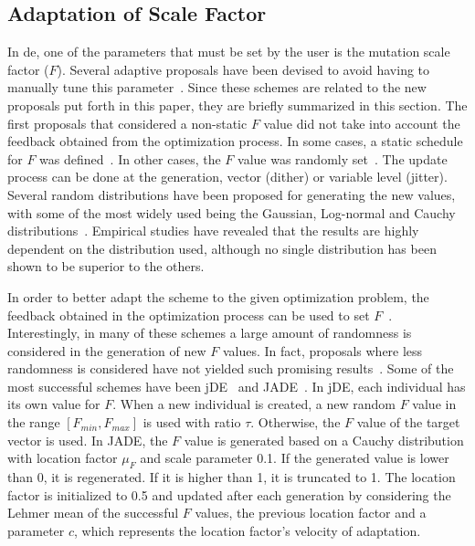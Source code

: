 \documentclass[review,3p]{elsarticle}
\newcommand{\DE}{{\sc de}}
\newcommand{\NP}{{\sc np}}
\begin{document}
\subsection{Adaptation of Scale Factor}

%
%
%
%
%

In \DE{}, one of the parameters that must be set by the user is the mutation scale factor ($F$).
%
Several adaptive proposals have been devised to avoid having to manually tune this parameter~\cite{Das:11}.
%
Since these schemes are related to the new proposals put forth in this paper, they are briefly summarized in this section.
%
The first proposals that considered a non-static $F$ value did not take into account the feedback obtained from the optimization process.
%
In some cases, a static schedule for $F$ was defined~\cite{Das:05b}. 
%
In other cases, the $F$ value was randomly set~\cite{Price:05}.
%
The update process can be done at the generation, vector (dither) or variable level (jitter).
%
Several random distributions have been proposed for generating the new values,
with some of the most widely used being the Gaussian, Log-normal and Cauchy distributions~\cite{Price:13}.
%
Empirical studies have revealed that the results are highly dependent on the distribution used, although
no single distribution has been shown to be superior to the others.

In order to better adapt the scheme to the given optimization problem,
the feedback obtained in the optimization process can be used to set $F$~\cite{Tvrdik:13,Zaharie:03}.
%
Interestingly, in many of these schemes %
a large amount of randomness
is considered in the generation of new $F$ values.
%
In fact, proposals where less randomness is considered have not yielded such promising results~\cite{Brest:08b}.
%
Some of the most successful schemes have been jDE~\cite{Brest:06} and JADE~\cite{Zhang:09}.
%
In jDE, each individual has its own value for $F$.
%
When a new individual is created, a new random $F$ value in the range $[F_{min}, F_{max}]$ is used with ratio $\tau$.
%
Otherwise, the $F$ value of the target vector is used.
%
In JADE, the $F$ value is generated based on a Cauchy distribution with location factor $\mu_F$ and scale parameter 0.1.
%
If the generated value is lower than 0, it is regenerated.
%
If it is higher than 1, it is truncated to 1.
%
The location factor is initialized to 0.5 and updated after each generation by considering the Lehmer mean of the successful $F$ values,
the previous location factor and a parameter $c$, which represents the location factor's velocity of adaptation.
\end{document}

